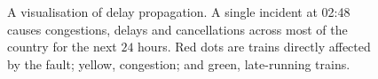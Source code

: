 \documentclass[12pt,a4paper]{article}
\begin{document}
\begin{figure}[h!]
    \centering
    \quad
    \quad
    \quad
    \caption{A visualisation of delay propagation. A single incident at 02:48 causes congestions, delays and cancellations across most of the country for the next $24$ hours. Red dots are trains directly affected by the fault; yellow, congestion; and green, late-running trains.}
    \label{fig:delay_propagation}
\end{figure}
\end{document}
